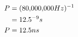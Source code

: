 \documentclass[preview,border=3mm]{standalone}
\begin{document}
\begin{align*}
    P &= (80,\!000,\!000 Hz)^{-1}\cr
      &= 12.5^{-9}s\cr
    P &= 12.5ns
\end{align*}
\end{document}
